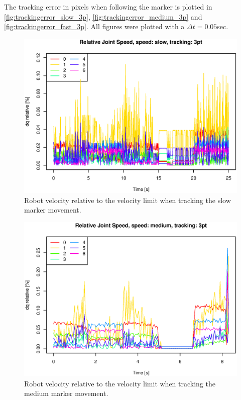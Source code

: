 The tracking error in pixels when following the marker is plotted in \ref{fig:trackingerror_slow_3p}, \ref{fig:trackingerror_medium_3p} and \ref{fig:trackingerror_fast_3p}.
All figures were plotted with a $\Delta t = 0.05$sec.



\begin{figure}[H]
\centering
\includegraphics[width= 0.9 \linewidth]{graphics/robotics/relativeConfVel_slow_3pt}
\caption{Robot velocity relative to the velocity limit when tracking the slow marker movement.}
\label{fig:robotspeed_slow_3p}
\end{figure}

\begin{figure}[H]
\centering
\includegraphics[width= 0.9 \linewidth]{graphics/robotics/relativeConfVel_medium_3pt}
\caption{Robot velocity relative to the velocity limit when tracking the medium marker movement.}
\label{fig:robotspeed_medium_3p}
\end{figure}

